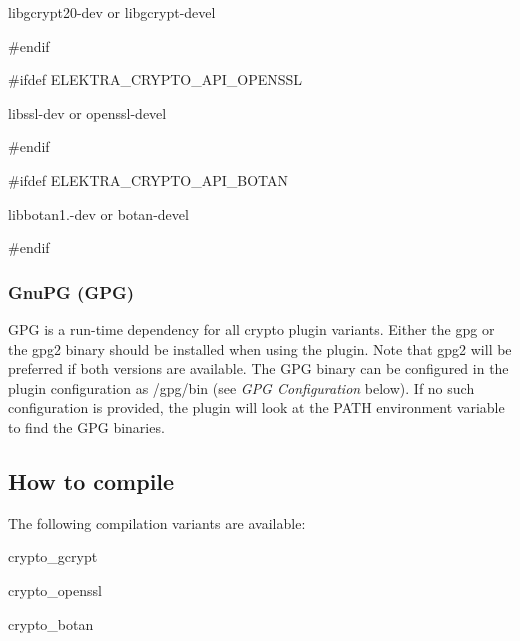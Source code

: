 \begin{DoxyItemize}
\item {\ttfamily libgcrypt20-\/dev} or {\ttfamily libgcrypt-\/devel}
\end{DoxyItemize}

\#endif

\#ifdef E\+L\+E\+K\+T\+R\+A\+\_\+\+C\+R\+Y\+P\+T\+O\+\_\+\+A\+P\+I\+\_\+\+O\+P\+E\+N\+S\+SL


\begin{DoxyItemize}
\item {\ttfamily libssl-\/dev} or {\ttfamily openssl-\/devel}
\end{DoxyItemize}

\#endif

\#ifdef E\+L\+E\+K\+T\+R\+A\+\_\+\+C\+R\+Y\+P\+T\+O\+\_\+\+A\+P\+I\+\_\+\+B\+O\+T\+AN


\begin{DoxyItemize}
\item {\ttfamily libbotan1.-\/dev} or {\ttfamily botan-\/devel}
\end{DoxyItemize}

\#endif

\subsubsection*{Gnu\+PG (G\+PG)}

G\+PG is a run-\/time dependency for all crypto plugin variants. Either the {\ttfamily gpg} or the {\ttfamily gpg2} binary should be installed when using the plugin. Note that {\ttfamily gpg2} will be preferred if both versions are available. The G\+PG binary can be configured in the plugin configuration as {\ttfamily /gpg/bin} (see {\itshape G\+PG Configuration} below). If no such configuration is provided, the plugin will look at the P\+A\+TH environment variable to find the G\+PG binaries.

\subsection*{How to compile}

The following compilation variants are available\+:


\begin{DoxyEnumerate}
\item crypto\+\_\+gcrypt
\item crypto\+\_\+openssl
\item crypto\+\_\+botan
\end{DoxyEnumerate}

